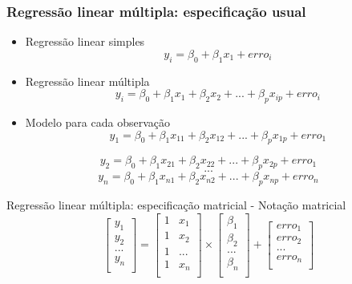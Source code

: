 \documentclass[
]{article}
\providecommand{\tightlist}{%
  \setlength{\itemsep}{0pt}\setlength{\parskip}{0pt}}
\begin{document}
\hypertarget{regressuxe3o-linear-muxfaltipla-especificauxe7uxe3o-usual}{%
\subsubsection{Regressão linear múltipla: especificação
usual}\label{regressuxe3o-linear-muxfaltipla-especificauxe7uxe3o-usual}}

\begin{itemize}
\tightlist
\item
  Regressão linear simples \[
  y_{i} = \beta_{0} +\beta_{1}x_{1} + erro_{i}
  \]
\item
  Regressão linear múltipla \[
  y_{i} = \beta_{0} + \beta_{1}x_{1} + \beta_{2}x_{2} + ... + \beta_{p}x_{ip} + erro_{i}
  \]
\item
  Modelo para cada observação
  \[y_{1} = \beta_{0} + \beta_{1}x_{11} + \beta_{2}x_{12} + ... + \beta_{p}x_{1p} + erro_{1}\]
\end{itemize}

\[y_{2} = \beta_{0} + \beta_{1}x_{21} + \beta_{2}x_{22} + ... + \beta_{p}x_{2p} + erro_{1}\]
\[...\]
\[y_{n} = \beta_{0} + \beta_{1}x_{n1} + \beta_{2}x_{n2} + ... + \beta_{p}x_{np} + erro_{n}\]

Regressão linear múltipla: especificação matricial - Notação matricial
\[
\begin{bmatrix}
y_{1}\\
y_{2}\\
...\\
y_{n}\\
\end{bmatrix}
= 
\begin{bmatrix}
1 & x_{1}\\
1 & x_{2}\\
1 & ...\\
1 & x_{n}\\
\end{bmatrix}
\times
\begin{bmatrix}
\beta_{1}\\
\beta_{2}\\
...\\
\beta_{n}\\
\end{bmatrix}
+
\begin{bmatrix}
erro_{1}\\
erro_{2}\\
...\\
erro_{n}\\
\end{bmatrix}
\]
\end{document}
